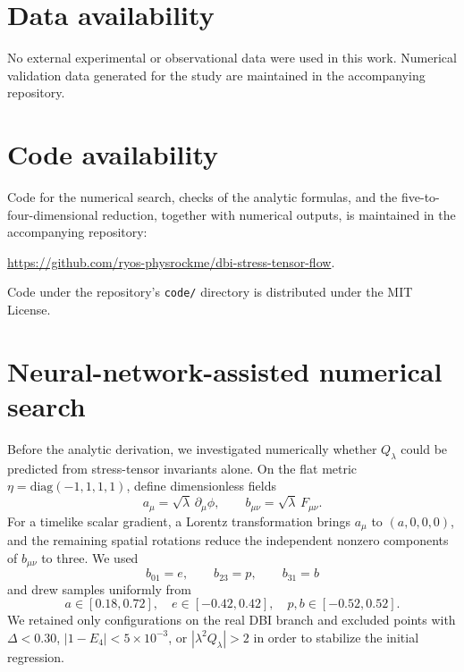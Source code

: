 \documentclass[a4paper,11pt]{article}
\numberwithin{equation}{section}
\begin{document}
\section*{Data availability}

No external experimental or observational data were used in this work. Numerical validation data generated for the study are maintained in the accompanying repository.

\section*{Code availability}

Code for the numerical search, checks of the analytic formulas, and the five-to-four-dimensional reduction, together with numerical outputs, is maintained in the accompanying repository:\par\smallskip\noindent\url{https://github.com/ryos-physrockme/dbi-stress-tensor-flow}.\par\smallskip\noindent Code under the repository's \texttt{code/} directory is distributed under the MIT License.

\appendix

\section{Neural-network-assisted numerical search}
\label{app:numerical-search}

Before the analytic derivation, we investigated numerically whether $Q_\lambda$ could be predicted from stress-tensor invariants alone. On the flat metric $\eta=\mathrm{diag}(-1,1,1,1)$, define dimensionless fields
\begin{equation}
 a_\mu=\sqrt\lambda\,\partial_\mu\phi,
 \qquad
 b_{\mu\nu}=\sqrt\lambda\,F_{\mu\nu}.
 \label{eq:dimensionless-fields-nn}
\end{equation}
For a timelike scalar gradient, a Lorentz transformation brings $a_\mu$ to $(a,0,0,0)$, and the remaining spatial rotations reduce the independent nonzero components of $b_{\mu\nu}$ to three. We used
\begin{equation}
 b_{01}=e,\qquad b_{23}=p,\qquad b_{31}=b
\end{equation}
and drew samples uniformly from
\begin{equation}
 a\in[0.18,0.72],\quad
 e\in[-0.42,0.42],\quad
 p,b\in[-0.52,0.52].
 \label{eq:nn-sampling-range}
\end{equation}
We retained only configurations on the real DBI branch and excluded points with $\Delta<0.30$, $|1-E_4|<5\times10^{-3}$, or $|\lambda^2Q_\lambda|>2$ in order to stabilize the initial regression.
\end{document}
